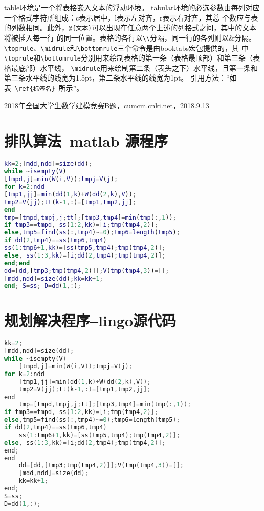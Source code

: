 \documentclass{cumcmthesis}
\begin{document}
\bigskip
table环境是一个将表格嵌入文本的浮动环境。
tabular环境的必选参数由每列对应一个格式字符所组成：c表示居中，l表示左对齐，r表示右对齐，其总
个数应与表的列数相同。此外，\verb|@{文本}|可以出现在任意两个上述的列格式之间，其中的文本将被插入每一行
的同一位置。表格的各行以\verb|\\|分隔，同一行的各列则以\&分隔。
\verb|\toprule|、\verb|\midrule|和\verb|\bottomrule|三个命令是由booktabs宏包提供的，其
中\verb|\toprule|和\verb|\bottomrule|分别用来绘制表格的第一条（表格最顶部）和第三条（表格最底部）水平线，
\verb|\midrule|用来绘制第二条（表头之下）水平线，且第一条和第三条水平线的线宽为1.5pt，第二条水平线的线宽为1pt。
引用方法：“如表~\verb|\ref{标签名}|~所示”。


\begin{thebibliography}{9}%
     2018年全国大学生数学建模竞赛B题，cumcm.cnki.net，2018.9.13
\end{thebibliography}

\newpage
\appendix
\section{排队算法--matlab 源程序}
\begin{lstlisting}[language=matlab]
kk=2;[mdd,ndd]=size(dd);
while ~isempty(V)
[tmpd,j]=min(W(i,V));tmpj=V(j);
for k=2:ndd
[tmp1,jj]=min(dd(1,k)+W(dd(2,k),V));
tmp2=V(jj);tt(k-1,:)=[tmp1,tmp2,jj];
end
tmp=[tmpd,tmpj,j;tt];[tmp3,tmp4]=min(tmp(:,1));
if tmp3==tmpd, ss(1:2,kk)=[i;tmp(tmp4,2)];
else,tmp5=find(ss(:,tmp4)~=0);tmp6=length(tmp5);
if dd(2,tmp4)==ss(tmp6,tmp4)
ss(1:tmp6+1,kk)=[ss(tmp5,tmp4);tmp(tmp4,2)];
else, ss(1:3,kk)=[i;dd(2,tmp4);tmp(tmp4,2)];
end;end
dd=[dd,[tmp3;tmp(tmp4,2)]];V(tmp(tmp4,3))=[];
[mdd,ndd]=size(dd);kk=kk+1;
end; S=ss; D=dd(1,:);
 \end{lstlisting}
 \section{规划解决程序--lingo源代码}
\begin{lstlisting}[language=c]
kk=2;
[mdd,ndd]=size(dd);
while ~isempty(V)
    [tmpd,j]=min(W(i,V));tmpj=V(j);
for k=2:ndd
    [tmp1,jj]=min(dd(1,k)+W(dd(2,k),V));
    tmp2=V(jj);tt(k-1,:)=[tmp1,tmp2,jj];
end
    tmp=[tmpd,tmpj,j;tt];[tmp3,tmp4]=min(tmp(:,1));
if tmp3==tmpd, ss(1:2,kk)=[i;tmp(tmp4,2)];
else,tmp5=find(ss(:,tmp4)~=0);tmp6=length(tmp5);
if dd(2,tmp4)==ss(tmp6,tmp4)
    ss(1:tmp6+1,kk)=[ss(tmp5,tmp4);tmp(tmp4,2)];
else, ss(1:3,kk)=[i;dd(2,tmp4);tmp(tmp4,2)];
end;
end
    dd=[dd,[tmp3;tmp(tmp4,2)]];V(tmp(tmp4,3))=[];
    [mdd,ndd]=size(dd);
    kk=kk+1;
end;
S=ss;
D=dd(1,:);
 \end{lstlisting}
\end{document}
